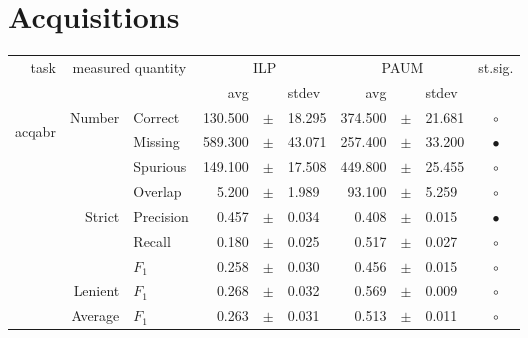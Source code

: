 \clearpage

\section{Acquisitions} \label{sec:complete_eval_acq}


\begin{longtable}{|r|r|l||rcl|rcl|c|}
\hline
\multirow{2}{*}{task} & \multicolumn{2}{|c||}{\multirow{2}{*}{measured quantity}} & \multicolumn{3}{|c|}{ILP} & \multicolumn{3}{|c|}{PAUM} & \multirow{2}{*}{st.sig.}\\
\cline{4-9}
  & \multicolumn{2}{|c||}{} &  avg  &    &  stdev  &  avg  &    &  stdev  & \\
\hline
\endhead
\hline
\hline
\multirow{11}{*}{\begin{sideways}acqabr\end{sideways} }
             & \multirow{4}{*}{    Number} &         Correct &     130.500 &  $\pm$  &      18.295 &     374.500 &  $\pm$  &      21.681 & $\circ$ \\
\cline{3-10} &                             &         Missing &     589.300 &  $\pm$  &      43.071 &     257.400 &  $\pm$  &      33.200 & $\bullet$ \\
\cline{3-10} &                             &        Spurious &     149.100 &  $\pm$  &      17.508 &     449.800 &  $\pm$  &      25.455 & $\circ$ \\
\cline{3-10} &                             &         Overlap &       5.200 &  $\pm$  &       1.989 &      93.100 &  $\pm$  &       5.259 & $\circ$ \\
\cline{2-10} & \multirow{3}{*}{    Strict} &       Precision &       0.457 &  $\pm$  &       0.034 &       0.408 &  $\pm$  &       0.015 & $\bullet$ \\
\cline{3-10} &                             &          Recall &       0.180 &  $\pm$  &       0.025 &       0.517 &  $\pm$  &       0.027 & $\circ$ \\
\cline{3-10} &                             &           $F_1$ &       0.258 &  $\pm$  &       0.030 &       0.456 &  $\pm$  &       0.015 & $\circ$ \\
\cline{2-10} &                     Lenient &           $F_1$ &       0.268 &  $\pm$  &       0.032 &       0.569 &  $\pm$  &       0.009 & $\circ$ \\
\cline{2-10} &                     Average &           $F_1$ &       0.263 &  $\pm$  &       0.031 &       0.513 &  $\pm$  &       0.011 & $\circ$ \\

\end{longtable}
